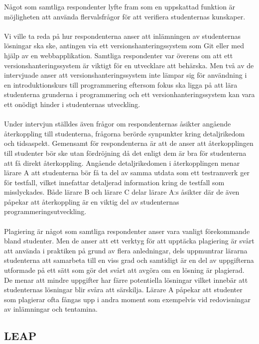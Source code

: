 \documentclass[a4paper,11pt]{article}
\begin{document}
{Något som samtliga respondenter lyfte fram som en uppskattad funktion är möjligheten att använda flervalsfrågor för att verifiera studenternas kunskaper.
\\
\\
Vi ville ta reda på hur respondenterna anser att inlämningen av studenternas lösningar ska ske, antingen via ett versionshanteringssystem som Git eller med hjälp av en webbapplikation. Samtliga respondenter var överens om att ett versionshanteringssystem är viktigt för en utvecklare att behärska. Men två av de intervjuade anser att versionshanteringssystem inte lämpar sig för användning i en introduktionskurs till programmering eftersom fokus ska ligga på att lära studenterna grunderna i programmering och ett versionhanteringssystem kan vara ett onödigt hinder i studenternas utveckling.
\\
\\
Under intervjun ställdes även frågor om respondenternas åsikter angående återkoppling till studenterna, frågorna berörde synpunkter kring detaljrikedom och tidsaspekt. Gemensamt för respondenterna är att de anser att återkopplingen till studenter bör ske utan fördröjning då det enligt dem är bra för studenterna att få direkt återkoppling. Angående detaljrikedomen i återkopplingen menar lärare A att studenterna bör få ta del av samma utdata som ett testramverk ger för testfall, vilket innefattar detaljerad information kring de testfall som misslyckades. Både lärare B och lärare C delar lärare A:s åsikter där de även påpekar att återkoppling är en viktig del av studenternas programmeringsutveckling.
\\
\\
Plagiering är något som samtliga respondenter anser vara vanligt förekommande bland studenter. Men de anser att ett verktyg för att upptäcka plagiering är svårt att använda i praktiken på grund av flera anledningar, dels uppmuntrar lärarna studenterna att samarbeta till en viss grad och samtidigt är en del av uppgifterna utformade på ett sätt som gör det svårt att avgöra om en lösning är plagierad. De menar att mindre uppgifter har färre potentiella lösningar vilket innebär att studenternas lösningar blir svåra att särskilja. Lärare A påpekar att studenter som plagierar ofta fångas upp i andra moment som exempelvis vid redovisningar av inlämningar och tentamina. 
 

\newpage
\subsection{LEAP} \label{LEAP}
}
\end{document}
